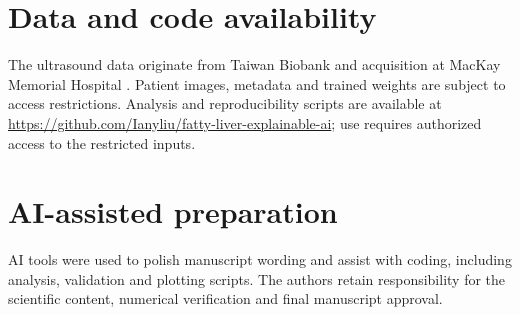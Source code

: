 \section*{Data and code availability}
The ultrasound data originate from Taiwan Biobank and acquisition at MacKay Memorial Hospital \citep{yen2024fattyliver}. Patient images, metadata and trained weights are subject to access restrictions. Analysis and reproducibility scripts are available at \url{https://github.com/Ianyliu/fatty-liver-explainable-ai}; use requires authorized access to the restricted inputs.

\section*{AI-assisted preparation}
AI tools were used to polish manuscript wording and assist with coding, including analysis, validation and plotting scripts. The authors retain responsibility for the scientific content, numerical verification and final manuscript approval.
